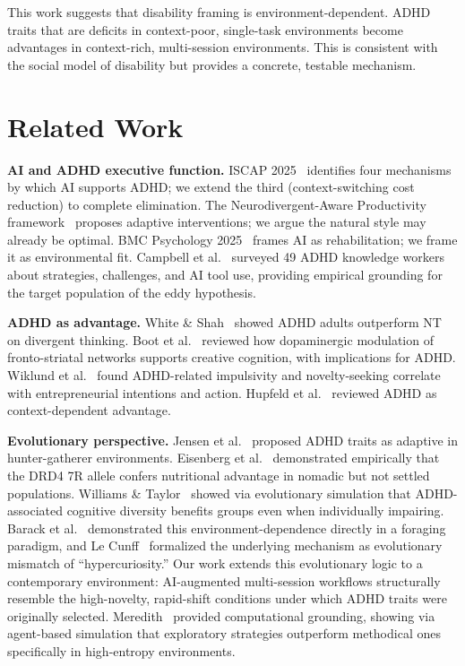 \documentclass[sigconf,nonacm]{acmart}
\begin{document}
This work suggests that disability framing is environment-dependent. ADHD traits that are deficits in context-poor, single-task environments become advantages in context-rich, multi-session environments. This is consistent with the social model of disability but provides a concrete, testable mechanism.

\section{Related Work}

\textbf{AI and ADHD executive function.} ISCAP 2025~\cite{iscap2025} identifies four mechanisms by which AI supports ADHD; we extend the third (context-switching cost reduction) to complete elimination. The Neurodivergent-Aware Productivity framework~\cite{arxiv2507} proposes adaptive interventions; we argue the natural style may already be optimal. BMC Psychology 2025~\cite{bmc2025} frames AI as rehabilitation; we frame it as environmental fit. Campbell et al.~\cite{campbell2024} surveyed 49 ADHD knowledge workers about strategies, challenges, and AI tool use, providing empirical grounding for the target population of the eddy hypothesis.

\textbf{ADHD as advantage.} White \& Shah~\cite{white2011} showed ADHD adults outperform NT on divergent thinking. Boot et al.~\cite{boot2017} reviewed how dopaminergic modulation of fronto-striatal networks supports creative cognition, with implications for ADHD. Wiklund et al.~\cite{wiklund2017} found ADHD-related impulsivity and novelty-seeking correlate with entrepreneurial intentions and action. Hupfeld et al.~\cite{hupfeld2019} reviewed ADHD as context-dependent advantage.

\textbf{Evolutionary perspective.} Jensen et al.~\cite{jensen1997} proposed ADHD traits as adaptive in hunter-gatherer environments. Eisenberg et al.~\cite{eisenberg2008} demonstrated empirically that the DRD4 7R allele confers nutritional advantage in nomadic but not settled populations. Williams \& Taylor~\cite{williams2006} showed via evolutionary simulation that ADHD-associated cognitive diversity benefits groups even when individually impairing. Barack et al.~\cite{barack2024} demonstrated this environment-dependence directly in a foraging paradigm, and Le Cunff~\cite{lecunff2024} formalized the underlying mechanism as evolutionary mismatch of ``hypercuriosity.'' Our work extends this evolutionary logic to a contemporary environment: AI-augmented multi-session workflows structurally resemble the high-novelty, rapid-shift conditions under which ADHD traits were originally selected. Meredith~\cite{meredith2025} provided computational grounding, showing via agent-based simulation that exploratory strategies outperform methodical ones specifically in high-entropy environments.
\end{document}
